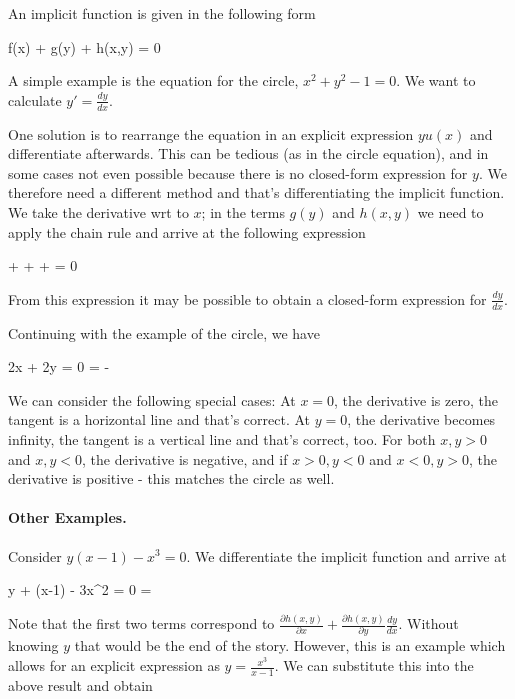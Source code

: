
An implicit function is given in the following form

\bee
f(x) + g(y) + h(x,y) = 0
\eee

A simple example is the equation for the circle, $x^2 + y^2 - 1 = 0$. We want to calculate $y' = \frac{dy}{dx}$.

One solution is to rearrange the equation in an explicit expression $y u(x)$ and differentiate afterwards. This can be tedious (as in the circle equation), and in some cases not even possible because there is no closed-form expression for $y$. We therefore need a different method and that's differentiating the implicit function. We take the derivative wrt to $x$; in the terms $g(y)$ and $h(x,y)$ we need to apply the chain rule and arrive at the following expression

\bee
{} +   +  +  = 0
\eee

From this expression it may be possible to obtain a closed-form expression for $\frac{dy}{dx}$.

Continuing with the example of the circle, we have

\bee
2x + 2y  = 0 \rightarrow {} = -
\eee

We can consider the following special cases: At $x=0$, the derivative is zero, the tangent is a horizontal line and that's correct. At $y=0$, the derivative becomes infinity, the tangent is a vertical line and that's correct, too. For both $x,y > 0$ and $x,y<0$, the derivative is negative, and if $x>0, y<0$ and $x<0, y>0$, the derivative is positive - this matches the circle as well.

\paragraph{Other Examples.} Consider $y(x-1) - x^3 = 0$. We differentiate the implicit function and arrive at

\bee
y + (x-1)  - 3x^2 = 0 \rightarrow {} = 
\eee

Note that the first two terms correspond to $\frac{\partial h(x,y)}{\partial x} + \frac{\partial h(x,y)}{\partial y}\frac{dy}{dx}$. Without knowing $y$ that would be the end of the story. However, this is an example which allows for an explicit expression as $y = \frac{x^3}{x-1}$. We can substitute this into the above result and obtain

